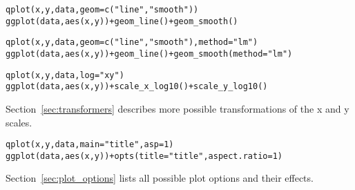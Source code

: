 \begin{alltt}
qplot(x, y, data, geom=c("line", "smooth"))
ggplot(data, aes(x, y)) + geom_line() + geom_smooth()
\end{alltt}

\begin{alltt}
qplot(x, y, data, geom=c("line", "smooth"), method="lm")
ggplot(data, aes(x, y)) + geom_line() + geom_smooth(method="lm")
\end{alltt}


\begin{alltt}
qplot(x, y, data, log="xy")
ggplot(data, aes(x, y)) + scale_x_log10() + scale_y_log10()
\end{alltt}

Section~\ref{sec:transformers} describes more possible transformations of the x and y scales.

\begin{alltt}
qplot(x, y, data, main="title", asp = 1)
ggplot(data, aes(x, y)) + opts(title = "title", aspect.ratio = 1)
\end{alltt}

Section~\ref{sec:plot_options} lists all possible plot options and their effects.



% 
% 
% 
% 
% 
% 
% 
% 
% 


